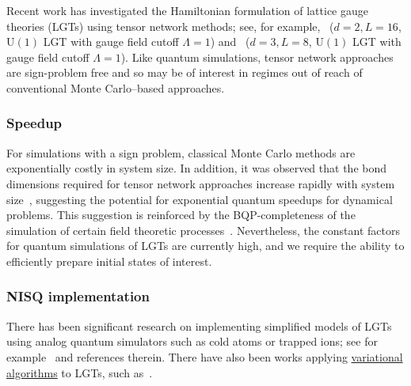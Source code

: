 \begin{refsection}
Recent work has investigated the Hamiltonian formulation of lattice gauge theories (LGTs) using tensor network methods; see, for example,~\cite{felser2020TensorNetworkLGT2D} ($d=2, L=16$, U$(1)$ LGT with gauge field cutoff $\Lambda=1$) and~\cite{magnifico2021TensorNetworkLGT3D} ($d=3, L=8$, U$(1)$ LGT with gauge field cutoff $\Lambda=1$). Like quantum simulations, tensor network approaches are sign-problem free and so may be of interest in regimes out of reach of conventional Monte Carlo--based approaches.




\subsubsection*{Speedup}
For simulations with a sign problem, classical Monte Carlo methods are exponentially costly in system size. In addition, it was observed that the bond dimensions required for tensor network approaches increase rapidly with system size~\cite{magnifico2021TensorNetworkLGT3D}, suggesting the potential for exponential quantum speedups for dynamical problems. This suggestion is reinforced by the BQP-completeness of the simulation of certain field theoretic processes~\cite{jordan2018bqpcompletenessofQFT}. Nevertheless, the constant factors for quantum simulations of LGTs are currently high, and we require the ability to efficiently prepare initial states of interest. 




\subsubsection*{NISQ implementation}
There has been significant research on implementing simplified models of LGTs using analog quantum simulators such as cold atoms or trapped ions; see for example~\cite{georgescu2014qSim, davoudi2022quantumHEP} and references therein. There have also been works applying \hyperref[prim:VQA]{variational algorithms} to LGTs, such as~\cite{kokail2019VariationalLatticeSchwinger,atas2021VariationalSU2,liu2022VariationalFieldTheorySim}.





\end{refsection}
